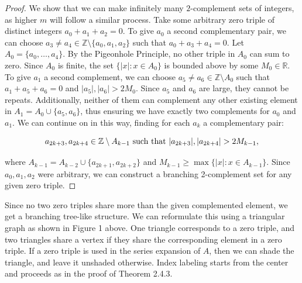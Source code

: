 \documentclass{article}
\theoremstyle{definition}
\newcommand{\R}{\mathbb{R}}
\newcommand{\Z}{\mathbb{Z}}
\begin{document}
\begin{proof}
    We show that we can make infinitely many $2$-complement sets of integers, as higher $m$ will follow a similar process. Take some arbitrary zero triple of distinct integers $a_0 + a_1 + a_2 = 0$. To give $a_0$ a second complementary pair, we can choose $a_3 \neq a_4 \in \Z \setminus \{a_0,a_1,a_2\}$ such that $a_0 + a_3 + a_4 = 0$. Let $A_0 = \{a_0,\dots,a_4\}$. By the Pigeonhole Principle, no other triple in $A_0$ can sum to zero. Since $A_0$ is finite, the set $\{|x| : x \in A_0\}$ is bounded above by some $M_0 \in \R$. To give $a_1$ a second complement, we can choose $a_5 \neq a_6 \in \Z \setminus A_0$ such that $a_1 + a_5 + a_6 = 0$ and $|a_5|,|a_6| > 2M_0$. Since $a_5$ and $a_6$ are large, they cannot be repeats. Additionally, neither of them can complement any other existing element in $A_1 = A_0 \cup \{a_5,a_6\}$, thus ensuring we have exactly two complements for $a_0$ and $a_1$. We can continue on in this way, finding for each $a_k$ a complementary pair:
    
    \[a_{2k+3},a_{2k+4} \in \Z \setminus A_{k-1} \textnormal{ such that } |a_{2k+3}|,|a_{2k+4}| > 2M_{k-1},\]
    
    where $A_{k-1} = A_{k-2} \cup \{a_{2k+1},a_{2k+2}\}$ and $M_{k-1} \geq \max\{|x| : x \in A_{k-1}\}$. Since $a_0,a_1,a_2$ were arbitrary, we can construct a branching 2-complement set for any given zero triple.
\end{proof}
Since no two zero triples share more than the given complemented element, we get a branching tree-like structure. We can reformulate this using a triangular graph as shown in Figure 1 above. One triangle corresponds to a zero triple, and two triangles share a vertex if they share the corresponding element in a zero triple. If a zero triple is used in the series expansion of $A$, then we can shade the triangle, and leave it unshaded otherwise. Index labeling starts from the center and proceeds as in the proof of Theorem 2.4.3.
\end{document}
